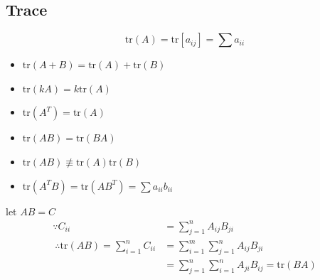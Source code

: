 	\subsection{Trace}
	    \begin{definition}
			$$\mathrm{tr}(A)=\mathrm{tr}[a_{ij}]=\sum a_{ii}$$
	    \end{definition}
		\begin{theorem}
			\begin{itemize}
				\item $\mathrm{tr}(A+B)=\mathrm{tr}(A)+\mathrm{tr}(B)$ 
				\item $\mathrm{tr}(kA)=k\mathrm{tr}(A)$
				\item $\mathrm{tr}(A^T)=\mathrm{tr}(A)$
				\item $\mathrm{tr}(AB)=\mathrm{tr}(BA)$
				\item $\mathrm{tr}(AB)\not\equiv\mathrm{tr}(A)\mathrm{tr}(B)$
				\item $\mathrm{tr}(A^TB)=\mathrm{tr}(AB^T)=\sum a_{ii}b_{ii}$
			\end{itemize}
		\end{theorem}
		\begin{example}[Prove $\forall A\in\mathbb{R}^{m\times n},B\in\mathbb{R}^{n\times m}\quad\mathrm{tr}(AB)=\mathrm{tr}(BA)$]
			let $AB=C$
			\begin{align*}
				\because C_{ii}&=\sum_{j=1}^nA_{ij}B_{ji}\\\
				\therefore\mathrm{tr}(AB)=\sum_{i=1}^nC_{ii}&=\sum_{i=1}^m\sum_{j=1}^nA_{ij}B_{ji}\\
				&=\sum_{j=1}^n\sum_{i=1}^nA_{ji}B_{ij}=\mathrm{tr}(BA)
			\end{align*}
		\end{example}
